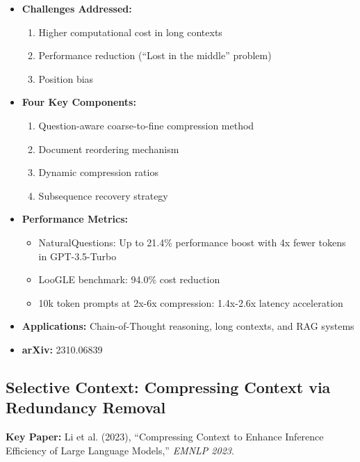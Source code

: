 \documentclass[11pt]{article}
\begin{document}
\begin{itemize}[leftmargin=*]
    \item \textbf{Challenges Addressed:}
    \begin{enumerate}
        \item Higher computational cost in long contexts
        \item Performance reduction (``Lost in the middle'' problem)
        \item Position bias
    \end{enumerate}
    \item \textbf{Four Key Components:}
    \begin{enumerate}
        \item Question-aware coarse-to-fine compression method
        \item Document reordering mechanism
        \item Dynamic compression ratios
        \item Subsequence recovery strategy
    \end{enumerate}
    \item \textbf{Performance Metrics:}
    \begin{itemize}
        \item NaturalQuestions: Up to 21.4\% performance boost with 4x fewer tokens in GPT-3.5-Turbo
        \item LooGLE benchmark: 94.0\% cost reduction
        \item 10k token prompts at 2x-6x compression: 1.4x-2.6x latency acceleration
    \end{itemize}
    \item \textbf{Applications:} Chain-of-Thought reasoning, long contexts, and RAG systems
    \item \textbf{arXiv:} 2310.06839
\end{itemize}

\subsection{Selective Context: Compressing Context via Redundancy Removal}

\textbf{Key Paper:} Li et al. (2023), ``Compressing Context to Enhance Inference Efficiency of Large Language Models,'' \textit{EMNLP 2023}.
\end{document}
